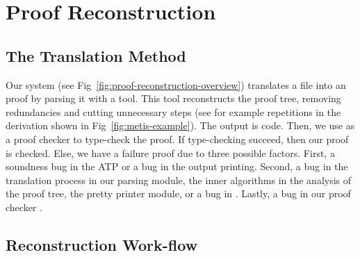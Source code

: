\documentclass[../main.tex]{subfiles}
\begin{document}

\section{Proof Reconstruction}
\label{sec:proof-reconstruction}

\subsection{The Translation Method}

Our system (see Fig~\ref{fig:proof-reconstruction-overview}) translates a \TSTP
file into an \Agda proof by parsing it with a \Haskell tool.
This tool reconstructs the proof tree, removing redundancies and
cutting unnecessary steps (see for example repetitions in the derivation shown in
Fig~\ref{fig:metis-example}). The output is \Agda code.
Then, we use \Agda as a proof checker to type-check the proof.
If type-checking succeed, then our proof is checked. Else, we have a failure
proof due to three possible factors. First, a soundness bug in the ATP or a bug
in the output printing. Second, a bug in the translation process in our \TSTP parsing
module, the inner algorithms in the analysis of the proof tree, the pretty printer
module, or a bug in \Haskell. Lastly, a bug in our proof checker \Agda.


\subsection{Reconstruction Work-flow}
\end{document}
